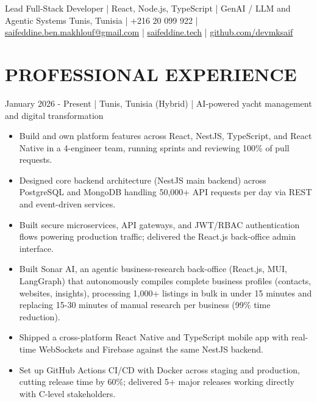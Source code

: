 


  {Lead Full-Stack Developer | React, Node.js, TypeScript | GenAI / LLM and Agentic Systems}
  {Tunis, Tunisia | +216 20 099 922 | \href{mailto:saifeddine.ben.makhlouf@gmail.com}{saifeddine.ben.makhlouf@gmail.com} | \href{https://saifeddine.tech}{saifeddine.tech} | \href{https://github.com/devmksaif}{github.com/devmksaif}}

\section{PROFESSIONAL EXPERIENCE}

  {January 2026 - Present | Tunis, Tunisia (Hybrid) | AI-powered yacht management and digital transformation}
\begin{itemize}
  \item Build and own platform features across React, NestJS, TypeScript, and React Native in a 4-engineer team, running sprints and reviewing 100\% of pull requests.
  \item Designed core backend architecture (NestJS main backend) across PostgreSQL and MongoDB handling 50,000+ API requests per day via REST and event-driven services.
  \item Built secure microservices, API gateways, and JWT/RBAC authentication flows powering production traffic; delivered the React.js back-office admin interface.
  \item Built Sonar AI, an agentic business-research back-office (React.js, MUI, LangGraph) that autonomously compiles complete business profiles (contacts, websites, insights), processing 1,000+ listings in bulk in under 15 minutes and replacing 15-30 minutes of manual research per business (99\% time reduction).
  \item Shipped a cross-platform React Native and TypeScript mobile app with real-time WebSockets and Firebase against the same NestJS backend.
  \item Set up GitHub Actions CI/CD with Docker across staging and production, cutting release time by 60\%; delivered 5+ major releases working directly with C-level stakeholders.
\end{itemize}

